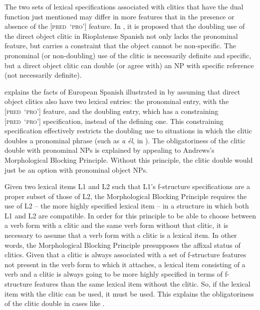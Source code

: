 \documentclass[output=paper,hidelinks]{langscibook}
\begin{document}
The two sets of lexical specifications associated with clitics that have the dual function just mentioned may differ in more features that in the presence or absence of the {[\textsc{pred}~`\textsc{pro}']} feature. In \citet{Estigarribia2013}, it is proposed that the doubling use of the direct object clitic in Rioplatense Spanish not only lacks the pronominal feature, but carries a constraint that the object cannot be non-specific. The pronominal (or non-doubling) use of the clitic is necessarily definite and specific, but a direct object clitic can double (or agree with) an NP with specific reference (not necessarily definite).

\citet{Andrews90} explains the facts of European Spanish illustrated in  by assuming that direct object clitics also have two lexical entries: the pronominal entry, with the {[\textsc{pred}~`\textsc{pro}']} feature, and the doubling entry, which has a constraining {[\textsc{pred}~`\textsc{pro}']} specification, instead of the defining one. This constraining specification effectively restricts the doubling use to situations in which the clitic doubles a pronominal phrase (such as \textit{a él}, in ). The obligatoriness of the clitic double with pronominal NPs is explained by appealing to Andrews's Morphological Blocking Principle. Without this principle, the clitic double would just be an option with pronominal object NPs.

Given two lexical items L1 and L2 such that L1's f-structure specifications are a proper subset of those of L2, the Morphological Blocking Principle requires the use of L2 -- the more highly specified lexical item -- in a structure in which both L1 and L2 are compatible. In order for this principle to be able to choose between a verb form with a clitic and the same verb form without that clitic, it is necessary to assume that a verb form with a clitic is a lexical item. In other words, the Morphological Blocking Principle presupposes the affixal status of clitics. Given that a clitic is always associated with a set of f-structure features not present in the verb form to which it attaches, a lexical item consisting of a verb and a clitic is always going to be more highly specified in terms of f-structure features than the same lexical item without the clitic. So, if the lexical item with the clitic can be used, it must be used. This explains the obligatoriness of the clitic double in cases like .
\end{document}
